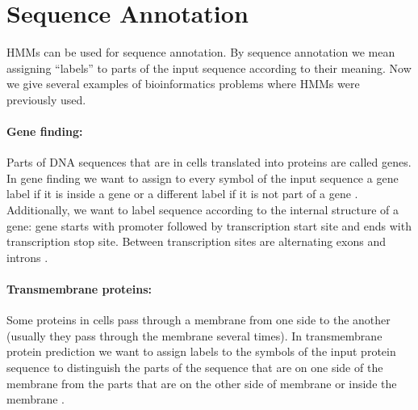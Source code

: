 \section{Sequence Annotation}


HMMs can be used for sequence annotation. By sequence annotation we mean
assigning ``labels'' to parts of the input sequence according to their meaning.
Now we give several examples of bioinformatics problems where HMMs were previously used.

\paragraph{Gene finding:} Parts of DNA sequences that are in cells translated
into proteins are called genes.  In gene finding we want to assign to every
symbol of the input sequence a gene label if it is inside a gene or a different
label if it is not part of a gene \cite{GeneWise2004, Brejova2005, Burge1997,
Alexanderson2004}. Additionally, we want to label sequence according to the
internal structure of a gene: gene starts with promoter followed by
transcription start site and ends with transcription stop site. Between
transcription sites are alternating exons and introns \cite{TODO}. 


\paragraph{Transmembrane proteins:} Some proteins in cells pass through a membrane
from one side to the another (usually they pass through the membrane several times).  In
transmembrane protein prediction we want to assign labels to the symbols of the input
protein sequence to distinguish the parts of the sequence that are on one side of the
membrane from the parts that are on the other side of membrane or inside the membrane
\cite{Brown2010}.

